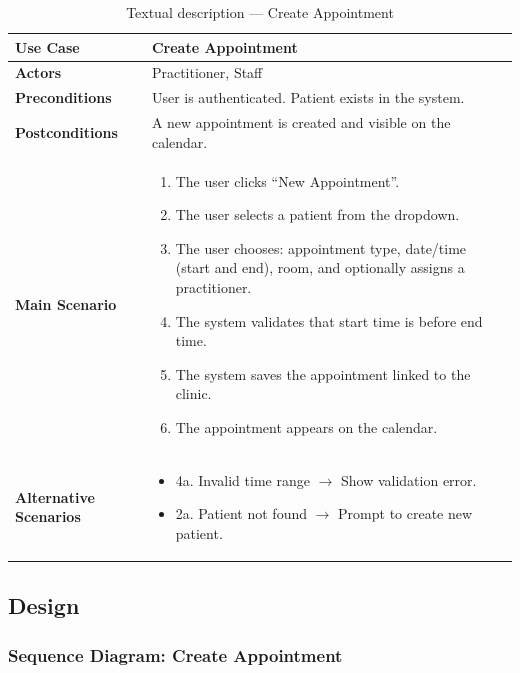 \documentclass[12pt,a4paper,oneside]{report}
\begin{document}
\begin{table}[H]
\centering
\caption{Textual description — Create Appointment}
\label{tab:uc_create_appt}
\begin{tabular}{|p{3.5cm}|p{9.5cm}|}
\hline
\textbf{Use Case} & Create Appointment \\
\hline
\textbf{Actors} & Practitioner, Staff \\
\hline
\textbf{Preconditions} & User is authenticated. Patient exists in the system. \\
\hline
\textbf{Postconditions} & A new appointment is created and visible on the calendar. \\
\hline
\textbf{Main Scenario} &
\begin{enumerate}[leftmargin=*, nosep]
    \item The user clicks ``New Appointment''.
    \item The user selects a patient from the dropdown.
    \item The user chooses: appointment type, date/time (start and end), room, and optionally assigns a practitioner.
    \item The system validates that start time is before end time.
    \item The system saves the appointment linked to the clinic.
    \item The appointment appears on the calendar.
\end{enumerate} \\
\hline
\textbf{Alternative Scenarios} &
\begin{itemize}[leftmargin=*, nosep]
    \item 4a. Invalid time range $\rightarrow$ Show validation error.
    \item 2a. Patient not found $\rightarrow$ Prompt to create new patient.
\end{itemize} \\
\hline
\end{tabular}
\end{table}

\subsection{Design}

\subsubsection{Sequence Diagram: Create Appointment}
\end{document}
